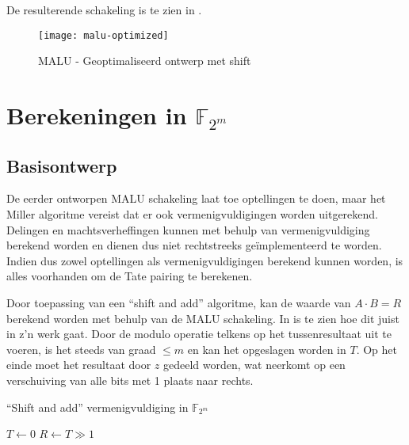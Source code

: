 De resulterende schakeling is te zien in .

\begin{figure}[h]
	\centering
		\texttt{[image: malu-optimized]}
		\caption{MALU - Geoptimaliseerd ontwerp met shift\label{figuur-implementatie-malu-optimized}}
\end{figure}

\section{Berekeningen in $\mathbb{F}_{2^m}$\label{sectie-implementatie-gf2m}}

\subsection{Basisontwerp\label{subsectie-implementatie-gf2m-basisontwerp}}

De eerder ontworpen MALU schakeling laat toe optellingen te doen, maar het Miller algoritme vereist dat er ook vermenigvuldigingen worden uitgerekend. Delingen en machtsverheffingen kunnen met behulp van vermenigvuldiging berekend worden en dienen dus niet rechtstreeks ge\"implementeerd te worden. Indien dus zowel optellingen als vermenigvuldigingen berekend kunnen worden, is alles voorhanden om de Tate pairing te berekenen.

Door toepassing van een ``shift and add'' algoritme, kan de waarde van \mbox{$A \cdot B = R$} berekend worden met behulp van de MALU schakeling. In  is te zien hoe dit juist in z'n werk gaat. Door de modulo operatie telkens op het tussenresultaat uit te voeren, is het steeds van graad $\leq m$ en kan het opgeslagen worden in $T$. Op het einde moet het resultaat door $z$ gedeeld worden, wat neerkomt op een verschuiving van alle bits met 1 plaats naar rechts.

\begin{algorithm}[h]
	\caption{``Shift and add'' vermenigvuldiging in $\mathbb{F}_{2^m}$}
	\label{algoritme-implementatie-gf2m-multiply}

	$T \leftarrow 0$\;
	$R \leftarrow T \gg 1$\;
\end{algorithm}

